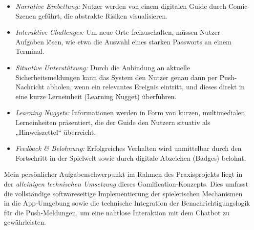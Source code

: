 \begin{itemize}
    \item \textit{Narrative Einbettung:} Nutzer werden von einem digitalen Guide durch Comic-Szenen geführt, die abstrakte Risiken visualisieren.
    \item \textit{Interaktive Challenges:} Um neue Orte freizuschalten, müssen Nutzer Aufgaben lösen, wie etwa die Auswahl eines starken Passworts an einem Terminal.
    \item \textit{Situative Unterstützung:} Durch die Anbindung an aktuelle Sicherheitsmeldungen kann das System den Nutzer genau dann per Push-Nachricht abholen, wenn ein relevantes 
    Ereignis eintritt, und dieses direkt in eine kurze Lerneinheit (Learning Nugget) überführen.
    \item \textit{Learning Nuggets:} Informationen werden in Form von kurzen, multimedialen Lerneinheiten präsentiert, die der Guide den Nutzern situativ als „Hinweiszettel“ überreicht.
    \item \textit{Feedback \& Belohnung:} Erfolgreiches Verhalten wird unmittelbar durch den Fortschritt in der Spielwelt sowie durch digitale Abzeichen (Badges) belohnt.
\end{itemize}

Mein persönlicher Aufgabenschwerpunkt im Rahmen des Praxisprojekts liegt in der \textit{alleinigen technischen Umsetzung} dieses Gamification-Konzepts. Dies umfasst die vollständige 
softwareseitige Implementierung der spielerischen Mechanismen in die App-Umgebung sowie die technische Integration der Benachrichtigungslogik für die Push-Meldungen, um eine nahtlose 
Interaktion mit dem Chatbot zu gewährleisten.
